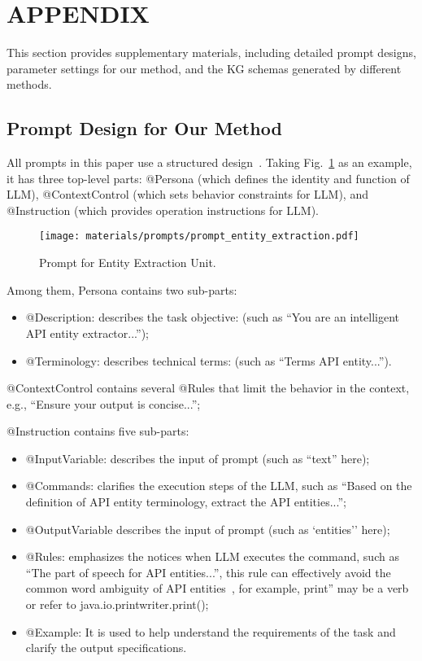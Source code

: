 \clearpage

\section*{APPENDIX}\label{sec: appendix}

This section provides supplementary materials, including detailed prompt designs, parameter settings for our method, and the KG schemas generated by different methods.

\subsection{Prompt Design for Our Method}
All prompts in this paper use a structured design~\cite{xing2025when}. 
Taking Fig.~\ref{fig: ee} as an example, it has three top-level parts: @Persona (which defines the identity and function of LLM), @ContextControl (which sets behavior constraints for LLM), and @Instruction (which provides operation instructions for LLM).

\begin{figure}[h]  %
    \centering
    \texttt{[image: materials/prompts/prompt\_entity\_extraction.pdf]}
    \caption{Prompt for Entity Extraction Unit.}
    \label{fig: ee}
\end{figure}

Among them, Persona contains two sub-parts: 
\begin{itemize}
\item @Description: describes the task objective: (such as ``You are an intelligent API entity extractor...'');
\item @Terminology: describes technical terms: (such as ``Terms API entity...'').
\end{itemize}

@ContextControl contains several @Rules that limit the behavior in the context, e.g., ``Ensure your output is concise...''; 

@Instruction contains five sub-parts:
\begin{itemize}
\item @InputVariable: describes the input of prompt (such as ``text'' here);
\item @Commands: clarifies the execution steps of the LLM, such as ``Based on the definition of API entity terminology, extract the API entities...'';
\item @OutputVariable describes the input of prompt (such as `entities'' here);
\item @Rules: emphasizes the notices when LLM executes the command, such as ``The part of speech for API entities...'', this rule can effectively avoid the common word ambiguity of API entities~\cite{yanbang1}, for example, print'' may be a verb or refer to java.io.printwriter.print();
\item @Example: It is used to help understand the requirements of the task and clarify the output specifications.
\end{itemize}


